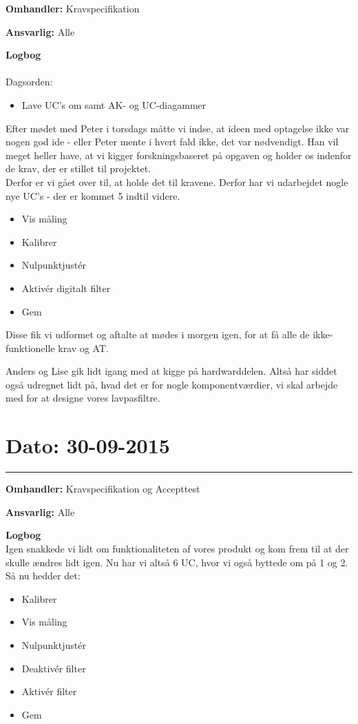 \textbf{Omhandler:} Kravspecifikation 

\textbf{Ansvarlig:} Alle 

\textbf{Logbog}
\\
\\
Dagsorden:
\begin{itemize}
	\item Lave UC's om samt AK- og UC-diagammer
\end{itemize}

Efter mødet med Peter i torsdags måtte vi indse, at ideen med optagelse ikke var nogen god ide - eller Peter mente i hvert fald ikke, det var nødvendigt. Han vil meget heller have, at vi kigger forskningsbaseret på opgaven og holder os indenfor de krav, der er stillet til projektet.\\
Derfor er vi gået over til, at holde det til kravene. Derfor har vi udarbejdet nogle nye UC's - der er kommet 5 indtil videre. 
\begin{itemize}
	\item Vis måling 
	\item Kalibrer
	\item Nulpunktjustér 
	\item Aktivér digitalt filter
	\item Gem 
\end{itemize}

Disse fik vi udformet og aftalte at mødes i morgen igen, for at få alle de ikke-funktionelle krav og AT. 

Anders og Lise gik lidt igang med at kigge på hardwarddelen. Altså har siddet også udregnet lidt på, hvad det er for nogle komponentværdier, vi skal arbejde med for at designe vores lavpasfiltre.  

\section{Dato: 30-09-2015 }
\hrule

\textbf{Omhandler:} Kravspecifikation og Accepttest  

\textbf{Ansvarlig:} Alle 

\textbf{Logbog}
\\
Igen snakkede vi lidt om funktionaliteten af vores produkt og kom frem til at der skulle ændres lidt igen. Nu har vi altså 6 UC, hvor vi også byttede om på 1 og 2. Så nu hedder det: 
\begin{itemize}
	\item Kalibrer
	\item Vis måling 
	\item Nulpunktjustér 
	\item Deaktivér filter 
	\item Aktivér filter
	\item Gem 
\end{itemize}

